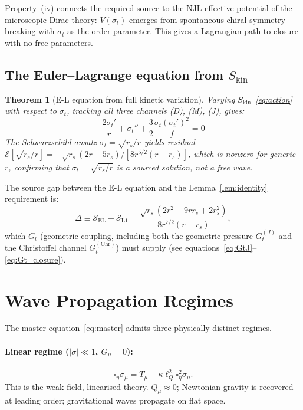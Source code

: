 \documentclass[11pt,a4paper]{article}
\theoremstyle{plain}
\newtheorem{theorem}{Theorem}[section]
\theoremstyle{definition}
\theoremstyle{remark}
\newcommand{\sigt}{\sigma_t}
\newcommand{\rs}{r_s}
\newcommand{\lQ}{\ell_Q}
\newcommand{\Skin}{S_{\mathrm{kin}}}
\begin{document}
Property~(iv) connects the required source to the NJL effective potential of the
microscopic Dirac theory: $V(\sigt)$ emerges from spontaneous chiral symmetry breaking
with $\sigt$ as the order parameter.  This gives a Lagrangian path to closure with
no free parameters.

\subsection{The Euler--Lagrange equation from $\Skin$}

\begin{theorem}[E-L equation from full kinetic variation]
\label{thm:EL}
Varying $\Skin$~\eqref{eq:action} with respect to $\sigt$, tracking all three
channels (D), (M), (J), gives:
\begin{equation}
  \boxed{\frac{2\sigt'}{r} + \sigt'' + \frac{3}{2}\frac{\sigt(\sigt')^2}{f} = 0}
  \label{eq:EL}
\end{equation}
The Schwarzschild ansatz $\sigt = \sqrt{\rs/r}$ yields residual
$\mathcal{E}[\sqrt{\rs/r}] = -\sqrt{\rs}(2r-5\rs)/[8r^{5/2}(r-\rs)]$, which is nonzero
for generic $r$, confirming that $\sigt = \sqrt{\rs/r}$ is a \emph{sourced}
solution, not a free wave.
\end{theorem}

The source gap between the E-L equation and the Lemma~\ref{lem:identity} requirement is:
\begin{equation}
  \Delta \equiv \mathcal{S}_{\mathrm{EL}} - \mathcal{S}_{\mathrm{L1}}
  = \frac{\sqrt{\rs}(2r^2-9r\rs+2\rs^2)}{8r^{7/2}(r-\rs)},
  \label{eq:gap}
\end{equation}
which $G_t$ (geometric coupling, including both the geometric pressure $G_t^{(J)}$ and
the Christoffel channel $G_t^{(\mathrm{Chr})}$) must supply (see equations~\eqref{eq:GtJ}--\eqref{eq:Gt_closure}).

\section{Wave Propagation Regimes}
\label{sec:regimes}

The master equation~\eqref{eq:master} admits three physically distinct regimes.

\paragraph{Linear regime ($|\sigma|\ll 1$, $G_\mu = 0$):}
\[
  \square_\eta\sigma_\mu = T_\mu + \kappa\lQ^2\square_\eta^2\sigma_\mu.
\]
This is the weak-field, linearised theory.  $Q_\mu \approx 0$; Newtonian gravity is
recovered at leading order; gravitational waves propagate on flat space.
\end{document}
